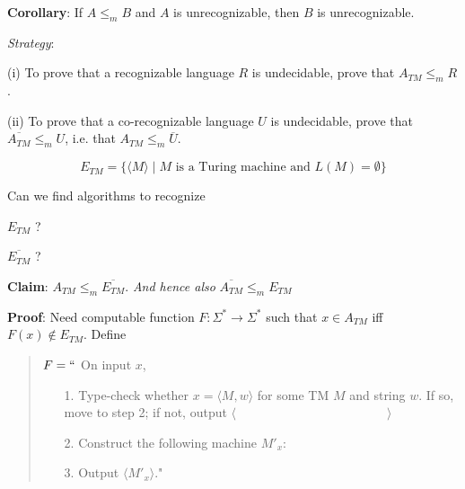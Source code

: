 \documentclass[12pt, oneside]{article}
\begin{document}
\vfill

{\bf Corollary}: If  $A \leq_m B$ and $A$ is unrecognizable, then $B$ is unrecognizable.

\vfill

{\it Strategy}:  

(i) To prove that a recognizable language $R$ is undecidable, prove that $A_{TM} \leq_m R$.


(ii) To prove that a co-recognizable language $U$ is undecidable, prove that $\overline{A_{TM}} \leq_m U$,
 i.e. that $A_{TM} \leq_m \overline{U}$.

 \newpage

\[
E_{TM} = \{ \langle M \rangle \mid \text{$M$ is a Turing machine and $L(M) = \emptyset$} \}
\]

\begin{comment}
Example  string in  $E_{TM}$ is \underline{\phantom{\hspace{1.6in}}} .
Example  string not  in  $E_{TM}$ is \underline{\phantom{\hspace{1.6in}}} .
\end{comment}

Can we find algorithms to recognize

$E_{TM}$  ? 

$\overline{E_{TM}}$ ? 

\vfill


{\bf Claim}: $A_{TM}  \leq_m \overline{E_{TM}}$. {\it And hence also } $\overline{A_{TM}} \leq_m E_{TM}$

{\bf Proof}: Need computable function  $F: \Sigma^* \to \Sigma^*$  such that  $x \in A_{TM}$ iff $F(x)  \notin  E_{TM}$.
Define

\vspace{-15pt}

\begin{quote}
$F =  ``$ On input $x$,
\begin{itemize}
\item[1.] Type-check whether  $x = \langle M, w \rangle$ for some TM $M$ and string $w$. 
If so, move to step 2; if  not, output  $\langle \hspace{2in} \rangle$
\item[2.] Construct the following machine $M'_x$:
\vspace{50pt}
\item[3.] Output $\langle M'_x \rangle$."
\end{itemize}
\end{quote}
\end{document}

